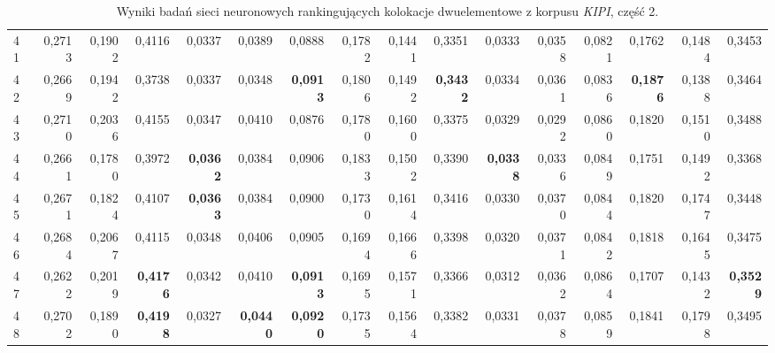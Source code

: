 \begin{table}[htp!]
\begin{adjustwidth}{-2cm}{}
\begin{tabular}{ l | *{15}{| r}}
41	&	0,2713	&	0,1902	&	0,4116	&	0,0337	&	0,0389	&	0,0888	&	0,1782	&	0,1441	&	0,3351	&	0,0333	&	0,0358	&	0,0821	&	0,1762	&	0,1484	&	0,3453	\\
42	&	0,2669	&	0,1942	&	0,3738	&	0,0337	&	0,0348	&	\textbf{0,0913}	&	0,1806	&	0,1492	&	\textbf{0,3432}	&	0,0334	&	0,0361	&	0,0836	&	\textbf{0,1876}	&	0,1388	&	0,3464	\\
43	&	0,2710	&	0,2036	&	0,4155	&	0,0347	&	0,0410	&	0,0876	&	0,1780	&	0,1600	&	0,3375	&	0,0329	&	0,0292	&	0,0860	&	0,1820	&	0,1510	&	0,3488	\\
44	&	0,2661	&	0,1780	&	0,3972	&	\textbf{0,0362}	&	0,0384	&	0,0906	&	0,1833	&	0,1502	&	0,3390	&	\textbf{0,0338}	&	0,0336	&	0,0849	&	0,1751	&	0,1492	&	0,3368	\\
45	&	0,2671	&	0,1824	&	0,4107	&	\textbf{0,0363}	&	0,0384	&	0,0900	&	0,1730	&	0,1614	&	0,3416	&	0,0330	&	0,0370	&	0,0844	&	0,1820	&	0,1747	&	0,3448	\\
46	&	0,2684	&	0,2067	&	0,4115	&	0,0348	&	0,0406	&	0,0905	&	0,1694	&	0,1666	&	0,3398	&	0,0320	&	0,0371	&	0,0842	&	0,1818	&	0,1645	&	0,3475	\\
47	&	0,2622	&	0,2019	&	\textbf{0,4176}	&	0,0342	&	0,0410	&	\textbf{0,0913}	&	0,1695	&	0,1571	&	0,3366	&	0,0312	&	0,0362	&	0,0864	&	0,1707	&	0,1432	&	\textbf{0,3529}	\\
48	&	0,2702	&	0,1890	&	\textbf{0,4198}	&	0,0327	&	\textbf{0,0440}	&	\textbf{0,0920}	&	0,1735	&	0,1564	&	0,3382	&	0,0331	&	0,0378	&	0,0859	&	0,1841	&	0,1798	&	0,3495	\\
	\bottomrule
\end{tabular}
 \end{adjustwidth}
\caption[Wyniki badań sieci neuronowych rankingujących kolokacje dwuelementowe z korpusu \emph{KIPI}, część 2]{Wyniki badań sieci neuronowych rankingujących kolokacje dwuelementowe z korpusu \emph{KIPI}, część 2.}
\label{KIPI_nn_part_2}
\end{table}


